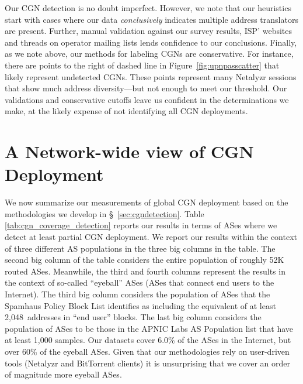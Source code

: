 \documentclass[10pt]{sig-alternate-05-2015}
\newcommand\xref[1]{\S~\ref{#1}}
\newcommand{\neta}{Netalyzr\xspace}
\begin{document}
Our CGN detection is no doubt imperfect.  However, we note that our
heuristics start with cases where our data \textit{conclusively}
indicates multiple address translators are present.  Further, manual
validation against our survey results, ISP' websites and threads on
operator mailing lists lends confidence to our conclusions.
Finally, as we note above, our methods for labeling CGNs are
conservative.  For instance, there are points to the right of dashed
line in Figure~\ref{fig:upnpasscatter} that likely represent
undetected CGNs.  These points represent many \neta sessions that
show much address diversity---but not enough to meet our threshold.
Our validations and conservative cutoffs leave us confident in the
determinations we make, at the likely expense of not identifying all
CGN deployments.



\section{A Network-wide view of CGN Deployment}
\label{sec:networkwideview}



We now summarize our measurements of global CGN deployment based on
the methodologies we develop in \xref{sec:cgndetection}.  Table
\ref{tab:cgn_coverage_detection} reports our results in terms of
ASes where we detect at least partial CGN deployment.  We report our
results within the context of three different AS populations in the
three big columns in the table.  The second big column of the table
considers the entire population of roughly 52K routed ASes.  Meanwhile,
the third and fourth columns represent the results in the context of
so-called ``eyeball'' ASes (ASes that connect end users to the Internet).
The third big column considers the
population of ASes that the Spamhaus Policy Block List \cite{pbl}
identifies as including the equivalent of at least 2,048~addresses
in ``end user'' blocks.  The last big column considers the
population of ASes to be those in the APNIC Labs AS Population
list \cite{aspop_apnic} that have at least 1,000 samples.
Our datasets cover 6.0\% of the ASes in the Internet, but over 60\%
of the eyeball ASes.  Given that our methodologies rely on
user-driven tools (Netalyzr and BitTorrent clients) it is
unsurprising that we cover an order of magnitude more eyeball ASes.
\end{document}
